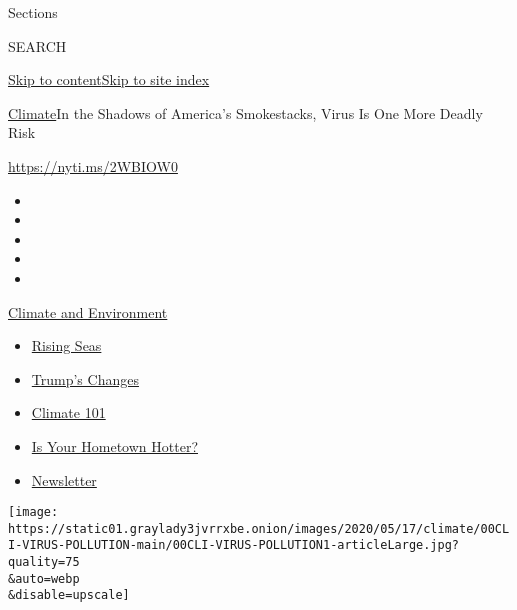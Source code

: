 Sections

SEARCH

\protect\hyperlink{site-content}{Skip to
content}\protect\hyperlink{site-index}{Skip to site index}

\href{/section/climate}{Climate}\textbar{}In the Shadows of America's
Smokestacks, Virus Is One More Deadly Risk

\url{https://nyti.ms/2WBIOW0}

\begin{itemize}
\item
\item
\item
\item
\item
\end{itemize}

\href{https://www.nytimes3xbfgragh.onion/section/climate?action=click\&pgtype=Article\&state=default\&region=TOP_BANNER\&context=storylines_menu}{Climate
and Environment}

\begin{itemize}
\tightlist
\item
  \href{https://www.nytimes3xbfgragh.onion/2020/07/30/climate/sea-level-inland-floods.html?action=click\&pgtype=Article\&state=default\&region=TOP_BANNER\&context=storylines_menu}{Rising
  Seas}
\item
  \href{https://www.nytimes3xbfgragh.onion/interactive/2020/climate/trump-environment-rollbacks.html?action=click\&pgtype=Article\&state=default\&region=TOP_BANNER\&context=storylines_menu}{Trump's
  Changes}
\item
  \href{https://www.nytimes3xbfgragh.onion/interactive/2020/04/19/climate/climate-crash-course-1.html?action=click\&pgtype=Article\&state=default\&region=TOP_BANNER\&context=storylines_menu}{Climate
  101}
\item
  \href{https://www.nytimes3xbfgragh.onion/interactive/2018/08/30/climate/how-much-hotter-is-your-hometown.html?action=click\&pgtype=Article\&state=default\&region=TOP_BANNER\&context=storylines_menu}{Is
  Your Hometown Hotter?}
\item
  \href{https://www.nytimes3xbfgragh.onion/newsletters/climate-change?action=click\&pgtype=Article\&state=default\&region=TOP_BANNER\&context=storylines_menu}{Newsletter}
\end{itemize}

\texttt{[image: https://static01.graylady3jvrrxbe.onion/images/2020/05/17/climate/00CLI-VIRUS-POLLUTION-main/00CLI-VIRUS-POLLUTION1-articleLarge.jpg?quality=75\\\&auto=webp\\\&disable=upscale]}

